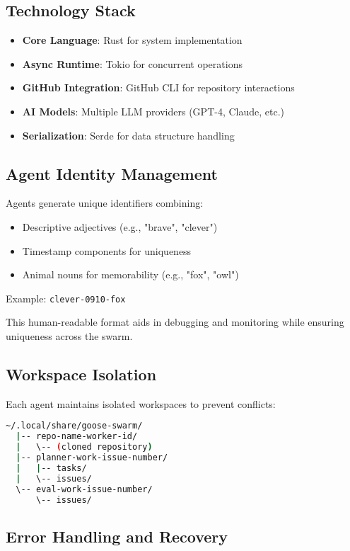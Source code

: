 \documentclass[11pt,a4paper]{article}
\begin{document}
\subsection{Technology Stack}

\begin{itemize}
    \item \textbf{Core Language}: Rust for system implementation
    \item \textbf{Async Runtime}: Tokio for concurrent operations
    \item \textbf{GitHub Integration}: GitHub CLI for repository interactions
    \item \textbf{AI Models}: Multiple LLM providers (GPT-4, Claude, etc.)
    \item \textbf{Serialization}: Serde for data structure handling
\end{itemize}

\subsection{Agent Identity Management}

Agents generate unique identifiers combining:
\begin{itemize}
    \item Descriptive adjectives (e.g., "brave", "clever")
    \item Timestamp components for uniqueness
    \item Animal nouns for memorability (e.g., "fox", "owl")
\end{itemize}

Example: \texttt{clever-0910-fox}

This human-readable format aids in debugging and monitoring while ensuring uniqueness across the swarm.

\subsection{Workspace Isolation}

Each agent maintains isolated workspaces to prevent conflicts:

\begin{lstlisting}[language=bash]
~/.local/share/goose-swarm/
  |-- repo-name-worker-id/
  |   \-- (cloned repository)
  |-- planner-work-issue-number/
  |   |-- tasks/
  |   \-- issues/
  \-- eval-work-issue-number/
      \-- issues/
\end{lstlisting}

\subsection{Error Handling and Recovery}
\end{document}

